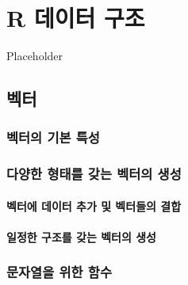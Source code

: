 \documentclass[
]{book}
\begin{document}
\hypertarget{data-structure}{%
\chapter{R 데이터 구조}\label{data-structure}}

Placeholder

\hypertarget{uxbca1uxd130}{%
\section{벡터}\label{uxbca1uxd130}}

\hypertarget{uxbca1uxd130uxc758-uxae30uxbcf8-uxd2b9uxc131}{%
\subsection{벡터의 기본 특성}\label{uxbca1uxd130uxc758-uxae30uxbcf8-uxd2b9uxc131}}

\hypertarget{uxb2e4uxc591uxd55c-uxd615uxd0dcuxb97c-uxac16uxb294-uxbca1uxd130uxc758-uxc0dduxc131}{%
\subsection{다양한 형태를 갖는 벡터의 생성}\label{uxb2e4uxc591uxd55c-uxd615uxd0dcuxb97c-uxac16uxb294-uxbca1uxd130uxc758-uxc0dduxc131}}

\hypertarget{uxbca1uxd130uxc5d0-uxb370uxc774uxd130-uxcd94uxac00-uxbc0f-uxbca1uxd130uxb4e4uxc758-uxacb0uxd569}{%
\subsubsection{벡터에 데이터 추가 및 벡터들의 결합}\label{uxbca1uxd130uxc5d0-uxb370uxc774uxd130-uxcd94uxac00-uxbc0f-uxbca1uxd130uxb4e4uxc758-uxacb0uxd569}}

\hypertarget{uxc77cuxc815uxd55c-uxad6cuxc870uxb97c-uxac16uxb294-uxbca1uxd130uxc758-uxc0dduxc131}{%
\subsubsection{일정한 구조를 갖는 벡터의 생성}\label{uxc77cuxc815uxd55c-uxad6cuxc870uxb97c-uxac16uxb294-uxbca1uxd130uxc758-uxc0dduxc131}}

\hypertarget{uxbb38uxc790uxc5f4uxc744-uxc704uxd55c-uxd568uxc218}{%
\subsection{문자열을 위한 함수}\label{uxbb38uxc790uxc5f4uxc744-uxc704uxd55c-uxd568uxc218}}
\end{document}
